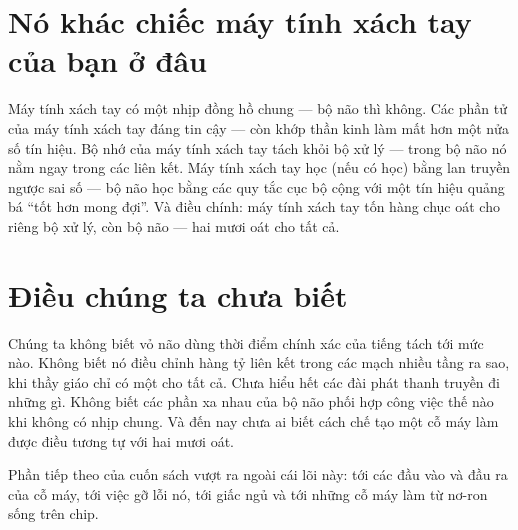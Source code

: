 \section*{Nó khác chiếc máy tính xách tay của bạn ở đâu}

Máy tính xách tay có một nhịp đồng hồ chung --- bộ não thì không. Các phần tử của máy tính xách tay đáng tin cậy --- còn khớp thần kinh làm mất hơn một nửa số tín hiệu. Bộ nhớ của máy tính xách tay tách khỏi bộ xử lý --- trong bộ não nó nằm ngay trong các liên kết. Máy tính xách tay học (nếu có học) bằng lan truyền ngược sai số --- bộ não học bằng các quy tắc cục bộ cộng với một tín hiệu quảng bá ``tốt hơn mong đợi''. Và điều chính: máy tính xách tay tốn hàng chục oát cho riêng bộ xử lý, còn bộ não --- hai mươi oát cho tất cả.

\section*{Điều chúng ta chưa biết}

Chúng ta không biết vỏ não dùng thời điểm chính xác của tiếng tách tới mức nào. Không biết nó điều chỉnh hàng tỷ liên kết trong các mạch nhiều tầng ra sao, khi thầy giáo chỉ có một cho tất cả. Chưa hiểu hết các đài phát thanh truyền đi những gì. Không biết các phần xa nhau của bộ não phối hợp công việc thế nào khi không có nhịp chung. Và đến nay chưa ai biết cách chế tạo một cỗ máy làm được điều tương tự với hai mươi oát.

Phần tiếp theo của cuốn sách vượt ra ngoài cái lõi này: tới các đầu vào và đầu ra của cỗ máy, tới việc gỡ lỗi nó, tới giấc ngủ và tới những cỗ máy làm từ nơ-ron sống trên chip.

